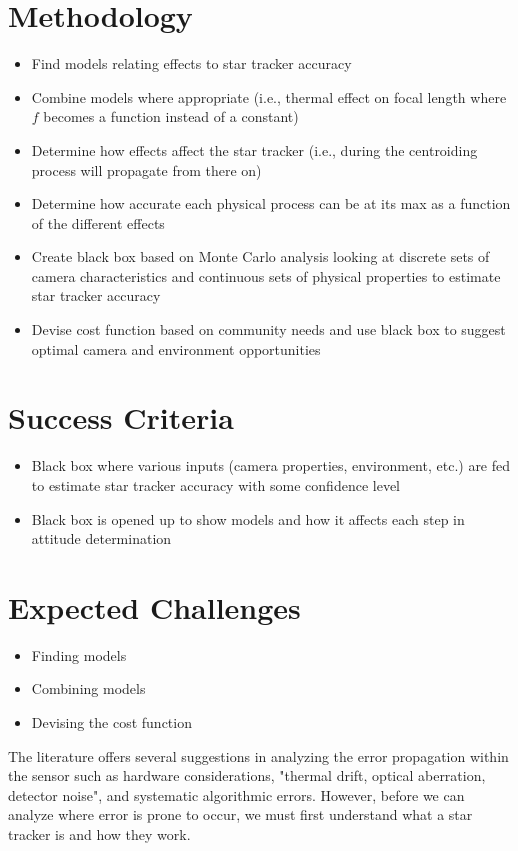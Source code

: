 \section{Methodology}
\begin{itemize}
    \item Find models relating effects to star tracker accuracy 
    \item Combine models where appropriate (i.e., thermal effect on focal length where $f$ becomes a function instead of a constant)
    \item Determine how effects affect the star tracker (i.e., during the centroiding process will propagate from there on)
    \item Determine how accurate each physical process can be at its max as a function of the different effects
    \item Create black box based on Monte Carlo analysis looking at discrete sets of camera characteristics and continuous sets of physical properties to estimate star tracker accuracy
    \item Devise cost function based on community needs and use black box to suggest optimal camera and environment opportunities 
\end{itemize}

\section{Success Criteria}
\begin{itemize}
    \item Black box where various inputs (camera properties, environment, etc.) are fed to estimate star tracker accuracy with some confidence level
    \item Black box is opened up to show models and how it affects each step in attitude determination 
\end{itemize}

\section{Expected Challenges}
\begin{itemize}
    \item Finding models
    \item Combining models 
    \item Devising the cost function 
\end{itemize}

\par \qquad The literature offers several suggestions in analyzing the error propagation within the sensor such as hardware considerations, "thermal drift, optical aberration, detector noise"\cite{systematic_error_analysis_of_star_tracker_centroiding}, and systematic algorithmic errors.
However, before we can analyze where error is prone to occur, we must first understand what a star tracker is and how they work.